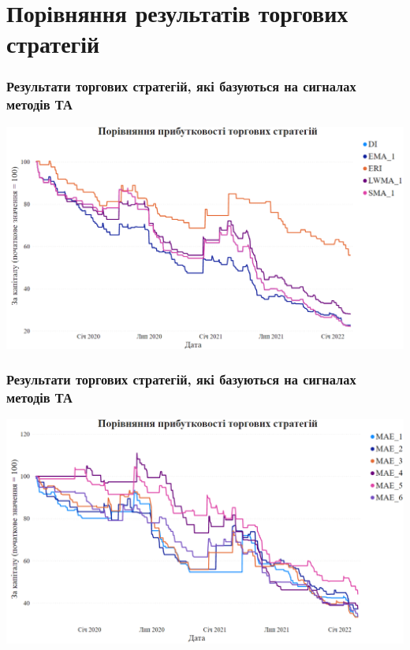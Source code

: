 \documentclass[aspectratio=169]{beamer}
\begin{document}
\section{Порівняння результатів торгових стратегій}

\begin{frame}
\frametitle{Результати торгових стратегій, які базуються на сигналах методів ТА}
\begin{center}
\includegraphics[scale=0.35]{Results Part 1.png}
\end{center}
\end{frame}

\begin{frame}
\frametitle{Результати торгових стратегій, які базуються на сигналах методів ТА}
\begin{center}
\includegraphics[scale=0.35]{Results Part 2.png}
\end{center}
\end{frame}
\end{document}
